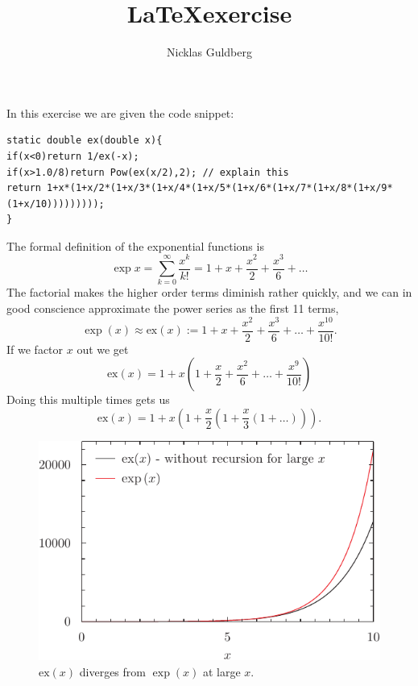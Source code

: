 \documentclass[UKenglish,a4paper, 11pt]{article}
\author{Nicklas Guldberg}
\title{\LaTeX exercise}
\newcommand{\ex}{\mathrm{ex}}
\begin{document}
\maketitle
In this exercise we are given the code snippet:
\begin{lstlisting}[breaklines]
static double ex(double x){
if(x<0)return 1/ex(-x);
if(x>1.0/8)return Pow(ex(x/2),2); // explain this
return 1+x*(1+x/2*(1+x/3*(1+x/4*(1+x/5*(1+x/6*(1+x/7*(1+x/8*(1+x/9*(1+x/10)))))))));
}
\end{lstlisting}
The formal definition of the exponential functions is
\begin{equation}
	\exp x = \sum_{k=0}^\infty \frac{x^k}{k!} = 1 + x + \frac{x^2}{2} + \frac{x^3}{6} + \dots
\end{equation}
The factorial makes the higher order terms diminish rather quickly, and we can in good conscience approximate the power series as the first 11 terms,
\begin{equation}
	\exp (x) \approx \mathrm{ex}(x) := 1 + x + \frac{x^2}{2} + \frac{x^3}{6} + \dots + \frac{x^{10}}{10!}. \label{eq:ex}
\end{equation}
If we factor $x$ out we get
\begin{equation}
	\ex (x) = 1 + x\left(1 + \frac{x}{2} + \frac{x^2}{6} + \dots + \frac{x^{9}}{10!}\right)
\end{equation}
Doing this multiple times gets us
\begin{equation}
	\ex (x) = 1 + x \left(1 + \frac{x}{2} \left(1 + \frac{x}{3}\left(1+ \dots\right)\right)\right).
\end{equation}
\begin{figure}[h]
	\centering
	\includegraphics[]{divplot.pdf}
	\caption{$\ex(x)$ diverges from $\exp(x)$ at large $x$. } \label{fig:exdiv}
\end{figure}
\end{document}
